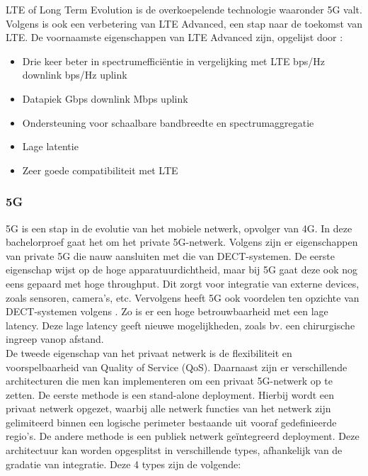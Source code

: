 LTE of Long Term Evolution is de overkoepelende technologie waaronder 5G valt. Volgens \textcite{Bakare2022} is ook een verbetering van LTE Advanced, een stap naar de toekomst van LTE. De voornaamste eigenschappen van LTE Advanced zijn, opgelijst door \textcite{Bakare2022}:

\begin{itemize}
  \item Drie keer beter in spectrumefficiëntie in vergelijking met LTE
   bps/Hz downlink
   bps/Hz uplink
  \item Datapiek 
   Gbps downlink
   Mbps uplink
  \item Ondersteuning voor schaalbare bandbreedte en spectrumaggregatie
  \item Lage latentie
  \item Zeer goede compatibiliteit met LTE
\end{itemize}

\subsubsection{5G}
5G is een stap in de evolutie van het mobiele netwerk, opvolger van 4G. In deze bachelorproef gaat het om het private 5G-netwerk. Volgens \textcite{wen2021private} zijn er eigenschappen van private 5G die nauw aansluiten met die van DECT-systemen. De eerste eigenschap wijst op de hoge apparatuurdichtheid, maar bij 5G gaat deze ook nog eens gepaard met hoge throughput. Dit zorgt voor integratie van externe devices, zoals sensoren, camera's, etc. Vervolgens heeft 5G ook voordelen ten opzichte van DECT-systemen volgens \textcite{wen2021private}. Zo is er een hoge betrouwbaarheid met een lage latency. Deze lage latency geeft nieuwe mogelijkheden, zoals bv. een chirurgische ingreep vanop afstand.\\ De tweede eigenschap van het privaat netwerk is de flexibiliteit en voorspelbaarheid van Quality of Service (QoS). Daarnaast zijn er verschillende architecturen die men kan implementeren om een privaat 5G-netwerk op te zetten. De eerste methode is een stand-alone deployment. Hierbij wordt een privaat netwerk opgezet, waarbij alle netwerk functies van het netwerk zijn gelimiteerd binnen een logische perimeter bestaande uit vooraf gedefinieerde regio's. De andere methode is een publiek netwerk geïntegreerd deployment. Deze architectuur kan worden opgesplitst in verschillende types, afhankelijk van de gradatie van integratie. Deze 4 types zijn de volgende:

